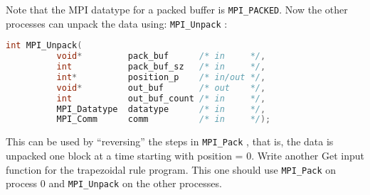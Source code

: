 Note that the MPI datatype for a packed buffer is \texttt{MPI\_PACKED}. Now the other processes can unpack the data using: \texttt{MPI\_Unpack} :
\begin{lstlisting}[language=C]
    int MPI_Unpack(
          void*         pack_buf      /* in     */,
          int           pack_buf_sz   /* in     */,
          int*          position_p    /* in/out */,
          void*         out_buf       /* out    */,
          int           out_buf_count /* in     */,
          MPI_Datatype  datatype      /* in     */,
          MPI_Comm      comm          /* in     */);
\end{lstlisting}
This can be used by “reversing” the steps in \texttt{MPI\_Pack} , that is, the data is unpacked one block at a time starting with position = 0. Write another Get input function for the trapezoidal rule program. This one should use \texttt{MPI\_Pack} on process 0 and \texttt{MPI\_Unpack} on the other processes.



